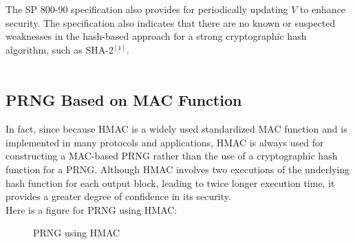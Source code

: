 \documentclass[12pt,a4paper,oneside]{report}
\begin{document}
The SP 800-90 specification also provides for periodically updating $V$ to enhance security. The specification also indicates that there are no known or suspected
weaknesses in the hash-based approach for a strong cryptographic hash algorithm, such as SHA-2$^{[1]}$.\\
\\

\subsection{PRNG Based on MAC Function}
In fact, since because HMAC is a widely used standardized MAC function and is implemented in many protocols and applications, HMAC is always used for constructing a MAC-based PRNG rather than the use of a cryptographic hash function for a PRNG. Although HMAC involves two
executions of the underlying hash function for each output block, leading to twice longer execution time, it provides a greater degree of confidence in its security.\\

Here is a figure for PRNG using HMAC:
\begin{figure}[H]
    \centering
    \caption{PRNG using HMAC}
    \label{fig:2}
\end{figure}
\end{document}
